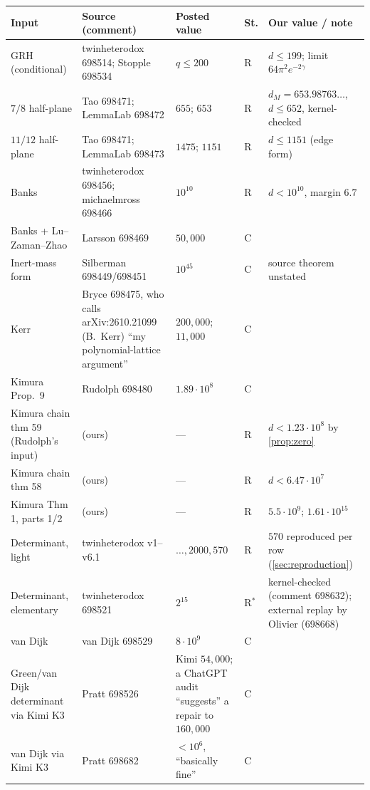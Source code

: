 \documentclass[11pt]{article}
\theoremstyle{definition}
\begin{document}
\begin{table}[ht]\centering\small
\begin{tabular}{@{}p{3.7cm}p{3.6cm}p{2.6cm}p{0.6cm}p{4.2cm}@{}}\toprule
Input & Source (comment) & Posted value & St. & Our value / note\\\midrule
GRH (conditional) & twinheterodox 698514; Stopple 698534 & $q \le 200$ & R & $d \le 199$; limit $64\pi^2e^{-2\gamma}$ \\
$7/8$ half-plane \cite{OAIqrh} & Tao 698471; LemmaLab 698472 & $655$; $653$ & R & $d_M = 653.98763\ldots$, $d \le 652$, kernel-checked \cite{CN1paper}\\
$11/12$ half-plane \cite{OAIqrh1112} & Tao 698471; LemmaLab 698473 & $1475$; $1151$ & R & $d \le 1151$ (edge form)\\
Banks \cite{Banks2026} & twinheterodox 698456; michaelmross 698466 & $10^{10}$ & R & $d < 10^{10}$, margin $6.7$\\
Banks + Lu--Zaman--Zhao & Larsson 698469 \cite{Larsson2026} & $50{,}000$ & C & \\
Inert-mass form & Silberman 698449/698451 & $10^{45}$ & C & source theorem unstated\\
Kerr \cite{Kerr2026} & Bryce 698475, who calls arXiv:2610.21099 (B.\ Kerr) ``my polynomial-lattice argument'' & $200{,}000$; $11{,}000$ & C & \\
Kimura \cite{Kimura2026} Prop.\ 9 & Rudolph 698480 & $1.89\cdot10^8$ & C & \\
Kimura chain thm 59 (Rudolph's input) & (ours) & --- & R & $d < 1.23\cdot10^8$ by \cref{prop:zero}\\
Kimura chain thm 58 & (ours) & --- & R & $d < 6.47\cdot 10^7$\\
Kimura Thm 1, parts 1/2 & (ours) & --- & R & $5.5\cdot10^9$; $1.61\cdot10^{15}$\\
Determinant, light & twinheterodox v1--v6.1 \cite{twinheterodox} & $\dots, 2000, 570$ & R & $570$ reproduced per row (\cref{sec:reproduction})\\
Determinant, elementary & twinheterodox 698521 & $2^{15}$ & R$^*$ & kernel-checked \cite{DETpaper} (comment 698632); external replay by Olivier (698668)\\
van Dijk \cite{vanDijk2026} & van Dijk 698529 & $8\cdot 10^9$ & C & \\
Green/van Dijk determinant via Kimi K3 & Pratt 698526 & Kimi $54{,}000$; a ChatGPT audit ``suggests'' a repair to $160{,}000$ & C & \\
van Dijk via Kimi K3 & Pratt 698682 & $<10^6$, ``basically fine'' & C & \\

\end{tabular}
\end{table}
\end{document}
